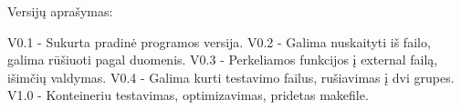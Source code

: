 Versijų aprašymas\+: \begin{DoxyVerb}V0.1 - Sukurta pradinė programos versija.
V0.2 - Galima nuskaityti iš failo, galima rūšiuoti pagal duomenis.
V0.3 - Perkeliamos funkcijos į external failą, išimčių valdymas.
V0.4 - Galima kurti testavimo failus, rušiavimas į dvi grupes.
V1.0 - Konteineriu testavimas, optimizavimas, pridetas makefile.
\end{DoxyVerb}
 
